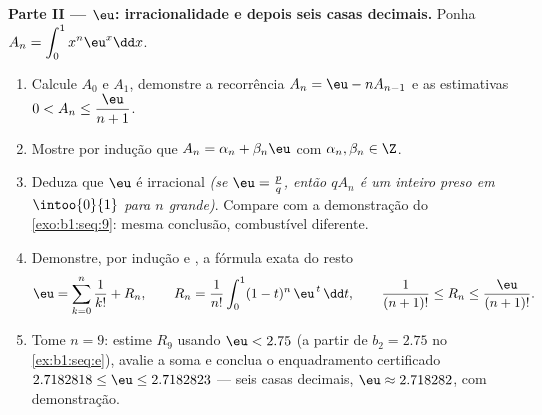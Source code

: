 \begin{problem}
\medskip
\noindent\textbf{Parte II --- $\eu$: irracionalidade e depois seis
casas decimais.} Ponha $A_n = \displaystyle\int_0^1 x^n \eu^x \dd x$.
\begin{enumerate}
  \item Calcule $A_0$ e $A_1$, demonstre a recorrência $A_n = \eu
        - n A_{n-1}$ e as estimativas $0 < A_n \leq
        \dfrac{\eu}{n+1}$.
  \item Mostre por indução que $A_n = \alpha_n + \beta_n \eu$
        com $\alpha_n, \beta_n \in \Z$.
  \item Deduza que $\eu$ é irracional \emph{(se $\eu = \frac
        pq$, então $q A_n$ é um inteiro preso em
        $\intoo{0}{1}$ para $n$ grande)}. Compare com a demonstração
        do \cref{exo:b1:seq:9}: mesma conclusão, combustível diferente.
  \item Demonstre, por indução e , a fórmula
        exata do resto
        \[
        \eu = \sum_{k=0}^{n} \frac{1}{k!} + R_n,
        \qquad
        R_n = \frac{1}{n!}\int_0^1 (1 - t)^n\,\eu^{\,t}\,\dd t,
        \qquad
        \frac{1}{(n+1)!} \leq R_n \leq \frac{\eu}{(n+1)!} .
        \]
  \item Tome $n = 9$: estime $R_9$ usando $\eu < 2.75$ (a partir de
        $b_2 = 2.75$ no \cref{ex:b1:seq:e}), avalie a soma
        e conclua o enquadramento certificado $2.7182818 \leq
        \eu \leq 2.7182823$ --- seis casas decimais, $\eu \approx
        2.718282$, com demonstração.
\end{enumerate}


\end{problem}
